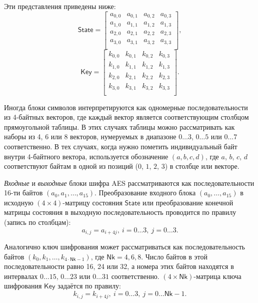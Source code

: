 Эти представления приведены ниже:
\[
    \mathsf{State} = \left[ \begin{array}{cccc}
        a_{0,0} & a_{0,1} & a_{0,2} & a_{0,3} \\
        a_{1,0} & a_{1,1} & a_{1,2} & a_{1,3} \\
        a_{2,0} & a_{2,1} & a_{2,2} & a_{2,3} \\
        a_{3,0} & a_{3,1} &a_{3,2} & a_{3,3}  \\
    \end{array} \right],
\] \[
    \mathsf{Key} = \left[ \begin{array}{cccc}
        k_{0,0} & k_{0,1} & k_{0,2} & k_{0,3} \\
        k_{1,0} & k_{1,1} & k_{1,2} & k_{1,3} \\
        k_{2,0} & k_{2,1} & k_{2,2} & k_{2,3} \\
        k_{3,0} & k_{3,1} & k_{3,2} & k_{3,3} \\
    \end{array} \right].
\]

Иногда блоки символов интерпретируются как одномерные последовательности из 4-байтных векторов, где каждый вектор является соответствующим столбцом прямоугольной таблицы. В этих случаях таблицы можно рассматривать как наборы из 4, 6 или 8 векторов, нумеруемых в диапазоне $0 \dots 3$, $0 \dots 5$ или $0 \dots 7$ соответственно. В тех случаях, когда нужно пометить индивидуальный байт внутри 4-байтного вектора, используется обозначение $(a, b, c, d)$, где $a$, $b$, $c$, $d$ соответствуют байтам в одной из позиций ($0$, $1$, $2$, $3$) в столбце или векторе.

\emph{Входные} и \emph{выходные} блоки шифра AES рассматриваются как последовательности 16-ти байтов $(a_0, a_1, \dots, a_{15})$. Преобразование входного блока $(a_0, \dots, a_{15})$ в исходную $(4 \times 4)$-матрицу состояния $\mathsf{State}$ или преобразование конечной матрицы состояния в выходную последовательность проводится по правилу (запись по столбцам):
    \[ a_{i,j} = a_{i + 4j}, ~ i = 0 \dots 3, ~ j = 0 \dots 3. \]

Аналогично ключ шифрования может рассматриваться как последовательность байтов $(k_0, k_1, \dots, k_{4 \cdot \mathsf{Nk} - 1})$, где $\mathsf{Nk} = 4, 6, 8$. Число байтов в этой последовательности равно 16, 24 или 32, а номера этих байтов находятся в интервалах $0 \dots 15$, $0 \dots 23$ или $0 \dots 31$ соответственно. $(4 \times \mathsf{Nk})$-матрица ключа шифрования $\mathsf{Key}$ задаётся по правилу:
    \[ k_{i,j} = k_{i + 4j}, ~ i = 0 \dots 3, ~ j = 0 \dots \mathsf{Nk} - 1. \]

